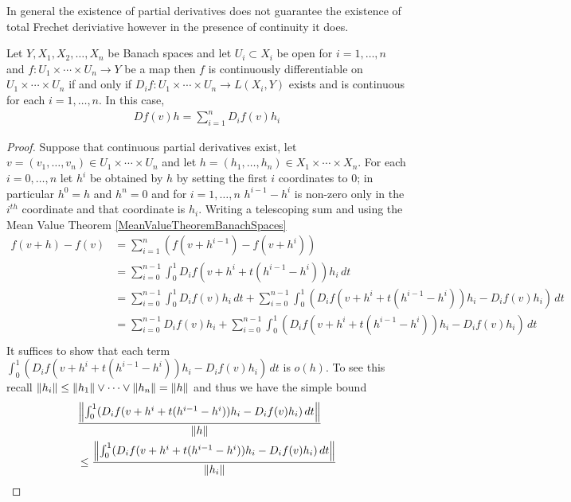In general the existence of partial derivatives does not guarantee the existence of total Frechet deriviative however in the presence of continuity it does.
\begin{prop}\label{PartialDerivativesBanachSpaces}Let $Y,X_1, X_2, \dotsc, X_n$ be Banach spaces and let $U_i \subset X_i$ be open for $i=1, \dotsc, n$ and $f : U_1 \times \dotsb \times U_n \to Y$ be a map then $f$ is continuously differentiable on $U_1 \times \dotsb \times U_n$ if and only if $D_i f : U_1 \times \dotsb \times U_n \to L(X_i,Y)$ exists and is continuous for each $i=1, \dotsc,n$.
In this case,
\begin{align*}
D f (v) h = \sum_{i=1}^n D_i f( v) h_i
\end{align*}
\end{prop}
\begin{proof}
Suppose that continuous partial derivatives exist, let $v=(v_1, \dotsc, v_n) \in U_1 \times \dotsb \times U_n$ and let $h=(h_1, \dotsc, h_n) \in X_1 \times \dotsb \times X_n$.  
For each $i=0, \dotsc, n$ let $h^i$ be obtained by $h$ by setting the first $i$ coordinates to $0$; in particular $h^0=h$ and $h^n=0$ and for $i=1, \dotsc, n$ $h^{i-1}-h^{i}$ is non-zero only in the $i^{th}$ coordinate and that coordinate is $h_i$.
Writing a telescoping sum and using the Mean Value Theorem \ref{MeanValueTheoremBanachSpaces}
\begin{align*}
  f(v + h) - f(v) &= \sum_{i=1}^{n} (f(v + h^{i-1}) - f(v+h^{i})) \\
                  &= \sum_{i=0}^{n-1} \int_0^1 D_i f(v+h^i + t(h^{i-1}-h^i)) h_i \, dt \\
                  &=\sum_{i=0}^{n-1} \int_0^1 D_i f (v) h_i \, dt + \sum_{i=0}^{n-1} \int_0^1 (D_i f(v+h^i + t(h^{i-1}-h^i)) h_i - D_i f (v) h_i )\, dt \\
                  &=\sum_{i=0}^{n-1} D_i f (v) h_i + \sum_{i=0}^{n-1} \int_0^1 (D_i f(v+h^i + t(h^{i-1}-h^i)) h_i - D_i f (v) h_i )\, dt \\
\end{align*}
It suffices to show that each term $\int_0^1 (D_i f(v+h^i + t(h^{i-1}-h^i)) h_i - D_i f (v) h_i )\, dt$ is $o(h)$.  To see this recall $\left \lVert h_i \right \rVert \leq \left \lVert h_1 \right \rVert \vee \dotsb \vee \left \lVert h_n \right \rVert = \left \lVert h \right \rVert$ and thus we have the simple bound
\begin{align*}
&\frac{\norm {\int_0^1 (D_i f(v+h^i + t(h^{i-1}-h^i)) h_i - D_i f (v) h_i )\, dt}}{\norm{h}} \\
&\leq \frac{\norm {\int_0^1 (D_i f(v+h^i + t(h^{i-1}-h^i)) h_i - D_i f (v) h_i )\, dt}}{\norm{h_i}} \\

\end{align*}
\end{proof}
